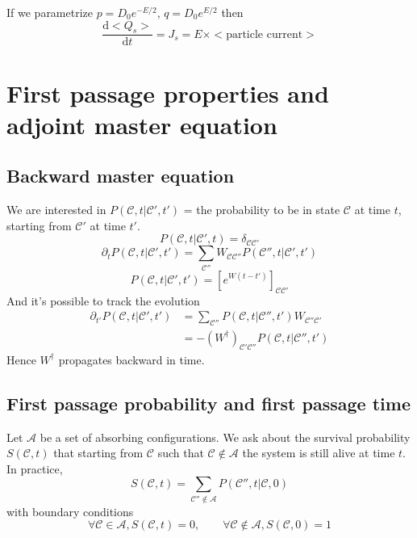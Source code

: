 \documentclass[a4paper]{book}
\theoremstyle{definition}
\theoremstyle{remark}
\begin{document}
If we parametrize $p = D_0e^{-E/2}$, $q=D_0e^{E/2}$ then 
\begin{equation}
    \frac{\text{d}<Q_s>}{\text{d}t} = J_s = E\times <\text{particle current}>
\end{equation}

\section{First passage properties and adjoint master equation}
\subsection{Backward master equation}

We are interested in $P(\mathscr{C}, t | \mathscr{C}', t')$ = the probability to be in state $\mathscr{C}$ at time $t$, starting from $\mathscr{C}'$ at time $t'$. 
\begin{equation}
    P(\mathscr{C}, t | \mathscr{C}', t) = \delta_{\mathscr{C}\mathscr{C}'}
\end{equation}
\begin{equation}
    \partial_t P(\mathscr{C}, t | \mathscr{C}', t') = \sum_{\mathscr{C}''} W_{\mathscr{C}\mathscr{C}''} P(\mathscr{C}'', t | \mathscr{C}', t')
\end{equation}
\begin{equation}
    P(\mathscr{C}, t | \mathscr{C}', t') = \left[e^{W(t-t')}\right]_{\mathscr{C}\mathscr{C}'}
\end{equation}
And it's possible to track the evolution 
\begin{equation}
    \begin{aligned}
        \partial_{t'}P(\mathscr{C}, t | \mathscr{C}', t') &= \sum_{\mathscr{C}''} P(\mathscr{C}, t | \mathscr{C}'', t')W_{\mathscr{C}''\mathscr{C}'} \\ 
        &= - (W^\dagger)_{\mathscr{C}'\mathscr{C}''}P(\mathscr{C}, t | \mathscr{C}'', t')
    \end{aligned}
\end{equation}
Hence $W^\dagger$ propagates backward in time. 

\subsection{First passage probability and first passage time}

Let $\mathcal{A}$ be a set of absorbing configurations. We ask about the survival probability $S(\mathscr{C}, t)$ that starting from $\mathscr{C}$ such that $\mathscr{C} \notin \mathcal{A}$ the system is still alive at time $t$. In practice, 
\begin{equation}
    S(\mathscr{C}, t) = \sum_{\mathscr{C}'' \notin \mathcal{A}} P(\mathscr{C}'', t | \mathscr{C}, 0)
\end{equation}
with boundary conditions 
\begin{equation}
    \forall \mathscr{C} \in \mathcal{A}, S(\mathscr{C}, t) = 0, \qquad \forall \mathscr{C} \notin \mathcal{A}, S(\mathscr{C}, 0) = 1
\end{equation}\par \medskip 
\end{document}
